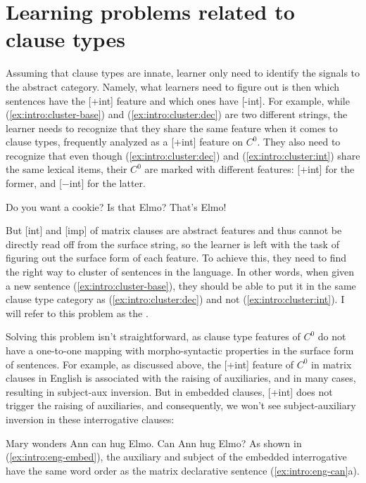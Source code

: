 \section{Learning problems related to clause types}
Assuming that clause types are innate, learner only need to identify the signals to the abstract category. Namely, what learners need to figure out is then which sentences have the [+int] feature and which ones have [-int]. 
For example, while (\ref{ex:intro:cluster-base}) and (\ref{ex:intro:cluster:dec}) are two different strings, the learner needs to recognize that they share the same feature when it comes to clause types, frequently analyzed as a [+int] feature on $C^{0}$. They also need to recognize that even though (\ref{ex:intro:cluster:dec}) and (\ref{ex:intro:cluster:int}) share the same lexical items, their $C^{0}$ are marked with different features: [+int] for the former, and [$-$int] for the latter.


Do you want a cookie?
\eex
{}
\bxl\label{ex:intro:cluster:int}
Is that Elmo?
\ex\label{ex:intro:cluster:dec}
That’s Elmo!
\exl
\eex


But [\textpm int] and [imp] of matrix clauses are abstract features and thus cannot be directly read off from the surface string, so the learner is left with the task of figuring out the surface form of each feature. To achieve this, they need to find the right way to cluster of sentences in the language. In other words, when given a new sentence (\ref{ex:intro:cluster-base}), they should be able to put it in the same clause type category as (\ref{ex:intro:cluster:dec}) and not (\ref{ex:intro:cluster:int}). I will refer to this problem as the . 

Solving this problem isn't straightforward, as clause type features of $C^{0}$ do not have a one-to-one mapping with morpho-syntactic properties in the surface form of sentences. For example, as discussed above, the [+int] feature of $C^{0}$ in matrix clauses in English is associated with the raising of auxiliaries, and in many cases, resulting in subject-aux inversion. But in embedded clauses, [+int] does not trigger the raising of auxiliaries, and consequently, we won't see subject-auxiliary inversion in these interrogative clauses: %

Mary wonders 
\eex
{}
\bxl
Ann can hug Elmo.
\ex Can Ann hug Elmo?
\exl
\eex
As shown in (\ref{ex:intro:eng-embed}), the auxiliary  and subject  of the embedded interrogative have the same word order as the matrix declarative sentence (\ref{ex:intro:eng-can}a).


